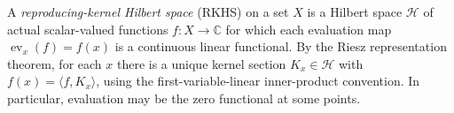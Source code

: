 
A \emph{reproducing-kernel Hilbert space} (RKHS) on a set $X$ is a Hilbert space $\mathcal H$ of actual scalar-valued functions $f:X\to\mathbb C$ for which each evaluation map $\operatorname{ev}_x(f)=f(x)$ is a continuous linear functional. By the Riesz representation theorem, for each $x$ there is a unique kernel section $K_x\in\mathcal H$ with $f(x)=\langle f,K_x\rangle$, using the first-variable-linear inner-product convention. In particular, evaluation may be the zero functional at some points.
